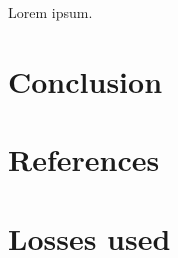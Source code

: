 \documentclass{article}
\begin{document}
Lorem ipsum.


\section*{Conclusion}


\section*{References}


\newpage
\appendix
\section{Losses used}
\label{appendix-losses}
\end{document}
